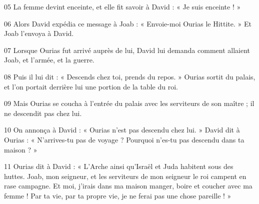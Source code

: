 
05 La femme devint enceinte, et elle fit savoir à David : « Je suis enceinte ! »

06 Alors David expédia ce message à Joab : « Envoie-moi Ourias le Hittite. » Et Joab l’envoya à David.

07 Lorsque Ourias fut arrivé auprès de lui, David lui demanda comment allaient Joab, et l’armée, et la guerre.

08 Puis il lui dit : « Descends chez toi, prends du repos. » Ourias sortit du palais, et l’on portait derrière lui une portion de la table du roi.

09 Mais Ourias se coucha à l’entrée du palais avec les serviteurs de son maître ; il ne descendit pas chez lui.

10 On annonça à David : « Ourias n’est pas descendu chez lui. » David dit à Ourias : « N’arrives-tu pas de voyage ? Pourquoi n’es-tu pas descendu dans ta maison ? »

11 Ourias dit à David : « L’Arche ainsi qu’Israël et Juda habitent sous des huttes. Joab, mon seigneur, et les serviteurs de mon seigneur le roi campent en rase campagne. Et moi, j’irais dans ma maison manger, boire et coucher avec ma femme ! Par ta vie, par ta propre vie, je ne ferai pas une chose pareille ! »
